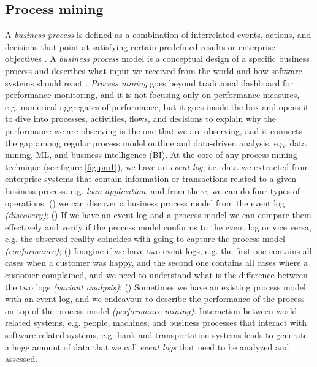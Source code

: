 \subsection{Process mining}
A \textit{business process} is defined as a combination of interrelated events, actions, and decisions that point at satisfying certain predefined results or enterprise objectives \cite{dumas2008business}. A \textit{business process} model is a conceptual design of a specific business process \cite{weske2007business} and describes what input we received from the world and how software systems should react  \cite{van2016data}. \textit{Process mining} goes beyond traditional dashboard for performance monitoring, and it is not focusing only on performance measures, e.g. numerical aggregates of performance, but it goes inside the box and opens it to dive into processes, activities, flows, and decisions to explain why the performance we are observing is the one that we are observing, and it connects the gap among regular process model outline and data-driven analysis, e.g. data mining, ML, and business intelligence (BI). At the core of any process mining technique (see figure \ref{fig:pm1}), we have an \textit{event log}, i.e. data we extracted from enterprise systems that contain information or transactions related to a given business process. e.g. \textit{loan application},  and from there, we can do four types of operations. () we can discover a business process model from the event log \textit{(discovery)}; () If we have an event log and a process model we can compare them effectively and verify if the process model conforms to the event log or vice versa, e.g. the observed reality coincides with going to capture the process model \textit{(conformance)}; () Imagine if we have two event logs, e.g. the first one contains all cases when a customer was happy, and the second one contains all cases where a customer complained, and we need to understand what is the difference between the two logs \textit{(variant analysis)}; () Sometimes we have an existing process model with an event log, and we endeavour to describe the performance of the process on top of the process model \textit{(performance mining)}. Interaction between world related systems, e.g. people, machines, and business processes that interact with software-related systems, e.g. bank and transportation systems leads to generate a huge amount of data that we call \textit{event logs} that need to be analyzed and assessed.


